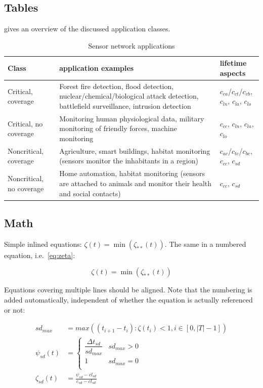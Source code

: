 \subsection{Tables}

 gives an overview of the discussed application classes.

\begin{table}
	\centering
	\begin{tabular}{>{\raggedright}p{1.8cm}p{5.4cm}p{3.4cm}}
		\toprule
		Class & application examples & lifetime aspects \\
		\midrule
		Critical, coverage & 
				Forest fire detection, flood detection, nuclear/chemical/biological attack detection, battlefield surveillance, intrusion detection & 
				$c_{ca}$/$c_{ct}$/$c_{cb}$, $c_{ln}$, $c_{la}$, $c_{lo}$\\
		Critical, no coverage & 
				Monitoring human physiological data, military monitoring of friendly forces, machine monitoring & 
				$c_{cc}$, $c_{ln}$, $c_{la}$, $c_{lo}$ \\
		Noncritical, coverage & 
				Agriculture, smart buildings, habitat monitoring (sensors monitor the inhabitants in a region) & 
				$c_{ac}$/$c_{tc}$/$c_{bc}$, $c_{cc}$, $c_{sd}$ \\
		Noncritical, no coverage & 
				Home automation, habitat monitoring (sensors are attached to animals and monitor their health and social contacts) & 
				$c_{cc}$, $c_{sd}$ 	\\
		\bottomrule
	\end{tabular}
	\caption{Sensor network applications}
	\label{tab:SensorNetworkApplications}
\end{table}


\subsection{Math}

Simple inlined equations: $\zeta(t) = \min( \zeta_{**}(t))$.
The same in a numbered equation, i.e.\ \cref{eq:zeta}:

\begin{equation}
\zeta(t) = \min( \zeta_{**}(t))
\label{eq:zeta}
\end{equation}

Equations covering multiple lines should be aligned. Note that the numbering is added automatically, independent of whether the equation is actually referenced or not:

\begin{align}
sd_{max} &= max((t_{i+1} - t_i) : \zeta(t_i) < 1, i \in [0, |T|-1]) \\
\psi_{sd}(t) &= \left\{ \begin{array}{cl}
\dfrac{\Delta t_{sd}}{sd_{max}} & sd_{max} > 0 \\
1 & sd_{max} = 0 \\
\end{array} \right.\\
\zeta_{sd}(t) &= \frac{\psi_{sd} - cl_{sd}}{c_{sd} - cl_{sd}}
\end{align}


